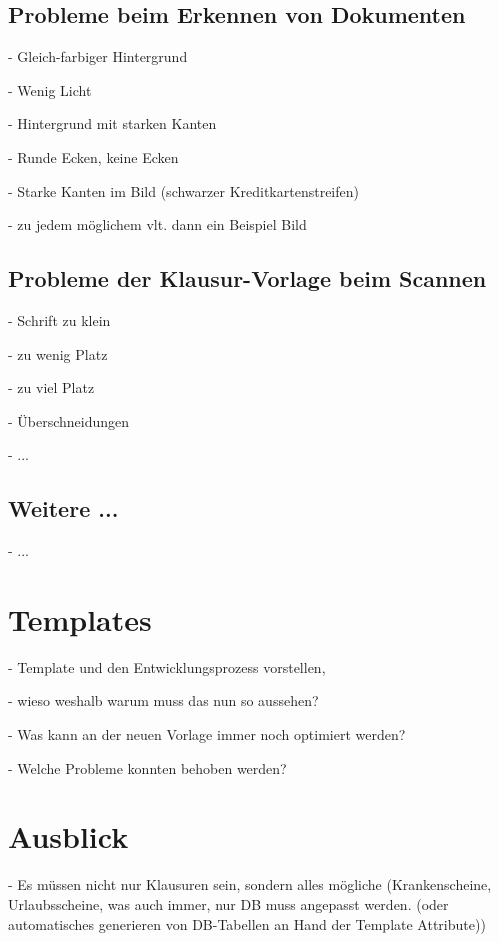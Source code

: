 \documentclass[nomenclature, 150]{HSMW-Thesis}
\begin{document}
	\section{Probleme beim Erkennen von Dokumenten}
		- Gleich-farbiger Hintergrund
			
		- Wenig Licht
		
		- Hintergrund mit starken Kanten
		
		- Runde Ecken, keine Ecken
		
		- Starke Kanten im Bild (schwarzer Kreditkartenstreifen)
		
		- zu jedem möglichem vlt. dann ein Beispiel Bild
		
	\section{Probleme der Klausur-Vorlage beim Scannen}
		- Schrift zu klein
		
		- zu wenig Platz
		
		- zu viel Platz
		
		- Überschneidungen
		
		- ...
		
	\section{Weitere ...}
		- ...




\chapter{Templates}
	- Template und den Entwicklungsprozess vorstellen, 
	
	- wieso weshalb warum muss das nun so aussehen?
	
	- Was kann an der neuen Vorlage immer noch optimiert werden?	
	
	- Welche Probleme konnten behoben werden?
	



		
\chapter{Ausblick}
	- Es müssen nicht nur Klausuren sein, sondern alles mögliche (Krankenscheine, Urlaubsscheine, was auch immer, nur DB muss angepasst werden. (oder automatisches generieren von DB-Tabellen an Hand der Template Attribute))
	
\end{document}

